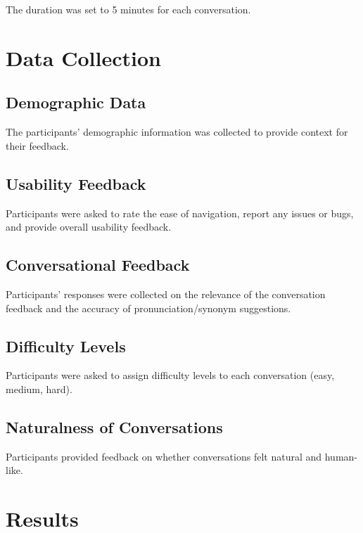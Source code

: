 \documentclass{article}
\begin{document}
The duration was set to 5 minutes for each conversation.

\section{Data Collection}

\subsection{Demographic Data}
The participants' demographic information was collected to provide context for their feedback.

\subsection{Usability Feedback}
Participants were asked to rate the ease of navigation, report any issues or bugs, and provide overall usability feedback.

\subsection{Conversational Feedback}
Participants' responses were collected on the relevance of the conversation feedback and the accuracy of pronunciation/synonym suggestions.

\subsection{Difficulty Levels}
Participants were asked to assign difficulty levels to each conversation (easy, medium, hard).

\subsection{Naturalness of Conversations}
Participants provided feedback on whether conversations felt natural and human-like.

\section{Results}
\end{document}

